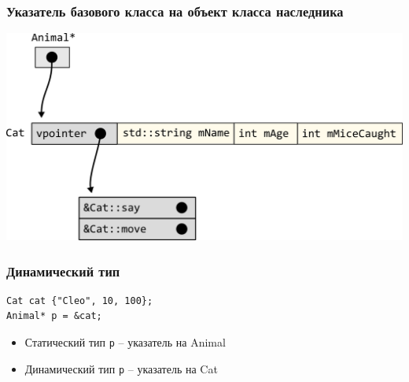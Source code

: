 \documentclass[10pt,pdf,hyperref={unicode}]{beamer}
\begin{document}
\begin{frame}[fragile]
\frametitle{Указатель базового класса на объект класса наследника}
\begin{center}
\includegraphics[width=\imageSizeMult\linewidth]{../images/virtual_animal_pointer_to_cat.png}
\end{center}
\end{frame}


\begin{frame}[fragile]
\frametitle{Динамический тип}
\begin{lstlisting}
Cat cat {"Cleo", 10, 100};
Animal* p = &cat;
\end{lstlisting}

\begin{itemize}
\item Статический тип \texttt{p} -- указатель на Animal
\item Динамический тип \texttt{p} -- указатель на Cat
\end{itemize}

\end{frame}
\end{document}

